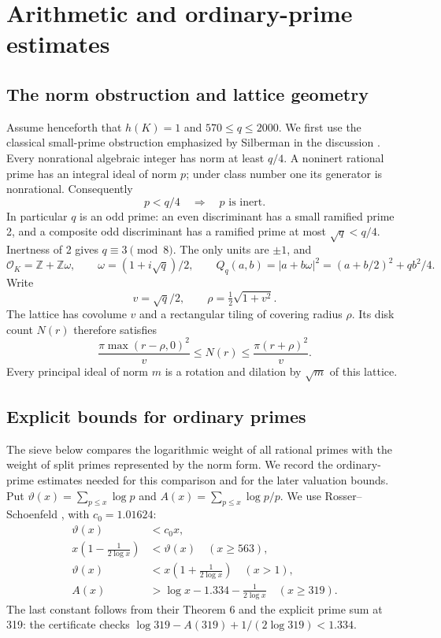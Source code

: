 \documentclass[11pt]{article}
\newcommand{\Z}{\mathbb Z}
\newcommand{\OK}{\mathcal O_K}
\begin{document}
\section{Arithmetic and ordinary-prime estimates}\label{background}
\subsection{The norm obstruction and lattice geometry}
Assume henceforth that \(h(K)=1\) and \(570\le q\le2000\).
We first use the classical small-prime obstruction emphasized by
Silberman in the discussion \cite{silberman}.
Every nonrational algebraic integer has norm at least \(q/4\).
A noninert rational prime has an integral ideal of norm \(p\);
under class number one its generator is nonrational. Consequently
\begin{equation}\label{small-inert}
 p<q/4\quad\Longrightarrow\quad p\text{ is inert}.
\end{equation}
In particular \(q\) is an odd prime: an even discriminant has a small
ramified prime 2, and a composite odd discriminant has a ramified prime
at most \(\sqrt q<q/4\). Inertness of 2 gives \(q\equiv3\pmod8\).
The only units are \(\pm1\), and
\[
 \OK=\Z+\Z\omega,\qquad \omega=(1+i\sqrt q)/2,\qquad
 Q_q(a,b)=|a+b\omega|^2=(a+b/2)^2+qb^2/4.
\]
Write
\[
 v=\sqrt q/2,\qquad \rho=\tfrac12\sqrt{1+v^2}.
\]
The lattice has covolume \(v\) and a rectangular tiling of covering
radius \(\rho\). Its disk count \(N(r)\) therefore satisfies
\begin{equation}\label{disk}
 \frac{\pi\max(r-\rho,0)^2}{v}\le N(r)
 \le\frac{\pi(r+\rho)^2}{v}.
\end{equation}
Every principal ideal of norm \(m\) is a rotation and dilation by
\(\sqrt m\) of this lattice.

\subsection{Explicit bounds for ordinary primes}\label{prime-inputs}
The sieve below compares the logarithmic weight of all rational primes
with the weight of split primes represented by the norm form. We record
the ordinary-prime estimates needed for this comparison and for the
later valuation bounds.
Put \(\vartheta(x)=\sum_{p\le x}\log p\) and
\(A(x)=\sum_{p\le x}\log p/p\). We use Rosser--Schoenfeld
\cite{rs}, with \(c_0=1.01624\):
\begin{align}
 \vartheta(x)&<c_0x,\label{theta-global}\\
 x\left(1-\frac1{2\log x}\right)&<\vartheta(x)
       \quad(x\ge563),\label{theta-lower}\\
 \vartheta(x)&<x\left(1+\frac1{2\log x}\right)\quad(x>1),\label{theta-upper}\\
 A(x)&>\log x-1.334-\frac1{2\log x}\quad(x\ge319).
 \label{mertens}
\end{align}
The last constant follows from their Theorem 6 and the explicit prime
sum at 319: the certificate checks
\(\log319-A(319)+1/(2\log319)<1.334\).
\end{document}
